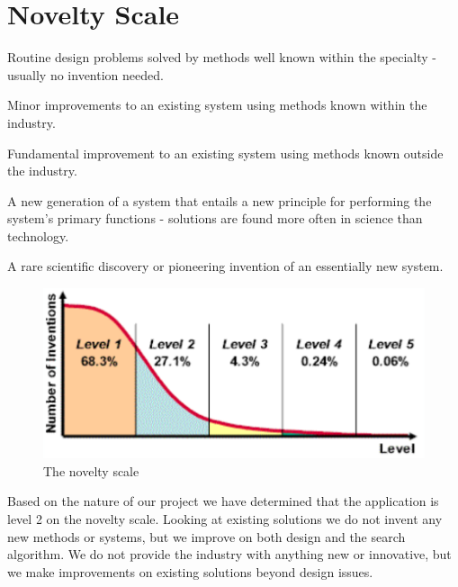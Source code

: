 \section*{Novelty Scale}
\begin{description}[noitemsep]
\item[Level 1] Routine design problems solved by methods well known within the specialty - usually 
no invention needed.
\item[Level 2] Minor improvements to an existing system using methods known within the industry.
\item[Level 3] Fundamental improvement to an existing system using methods known outside the 
industry.
\item[Level 4] A new generation of a system that entails a new principle for performing the system's 
primary functions - solutions are found more often in science than technology.
\item[Level 5] A rare scientific discovery or pioneering invention of an essentially new system.
\end{description}

\begin{figure}[H]
\centering
\includegraphics[width=0.7\columnwidth]{Selection_006.png}
\caption{The novelty scale\label{fig:novelty}}
\end{figure}

Based on the nature of our project we have determined that the application is level 2 on the novelty scale. Looking at existing solutions we do not invent any new methods or systems, but we improve on both design and the search algorithm. We do not provide the industry with anything new or innovative, but we make improvements on existing solutions beyond design issues.




